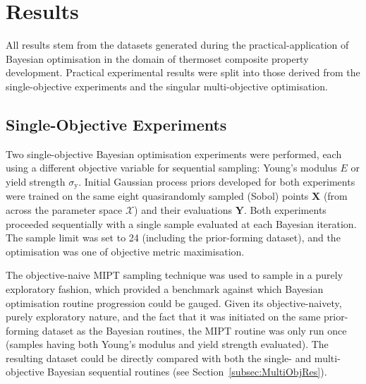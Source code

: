 \section{Results}
All results stem from the datasets generated during the practical-application
 of Bayesian optimisation in the domain of thermoset composite property
 development.
Practical experimental results were split into those derived from the
 single-objective experiments and the singular multi-objective optimisation.

\subsection{Single-Objective Experiments}
\label{subsec:UniObjRes}
Two single-objective Bayesian optimisation experiments were performed, each
 using a different objective variable for sequential sampling: Young's 
 modulus \(E\) or yield strength \(\sigma_{\mathrm{y}}\).
Initial Gaussian process priors developed for both experiments were trained
 on the same eight quasirandomly sampled (Sobol) points \(\mathbf{X}\) (from
 across the parameter space \(\mathcal{X}\)) and their evaluations
 \(\mathbf{Y}\).
Both experiments proceeded sequentially with a single sample evaluated at 
 each Bayesian iteration.
The sample limit was set to 24 (including the
 prior-forming dataset), and the optimisation was one of objective metric
 maximisation.

The objective-naive MIPT sampling technique was used to sample in a purely 
 exploratory fashion, which provided a benchmark against which Bayesian 
 optimisation routine progression could be gauged.
Given its objective-naivety, purely exploratory nature, and the fact that
 it was initiated on the same prior-forming dataset as the Bayesian routines,
 the MIPT routine was only run once (samples having both Young's
 modulus and yield strength evaluated).
The resulting dataset could be directly compared with both the single- 
 and multi-objective Bayesian sequential routines (see Section~\ref{subsec:MultiObjRes}).

